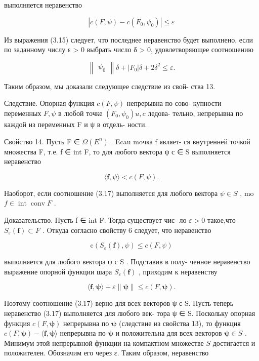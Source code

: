 \documentclass[8pt]{extarticle}
\begin{document}
выполняется неравенство

\[
\left| {c\left( {F,\psi }\right)  - c\left( {{F}_{0},{\psi }_{0}}\right) }\right|  \leq  \varepsilon
\]

Из выражения (3.15) следует, что последнее неравенство будет выполнено, если по заданному числу ε > 0 выбрать число δ > 0, удовлетворяющее соотношению

\[
\left\lVert \begin{array}{c} {\psi }_{0} \end{array} \right\rVert\delta  + \left| {F}_{0}\right| \delta  + 2{\delta }^{2} \leq  \varepsilon .
\]

Таким образом, мы доказали следующее следствие из свой- ства 13.

Следствие. Опорная функция \(c\left( {F,\psi }\right)\) непрерывна по сово- купности переменных \(F,\psi\) в любой точке \(\left( {{F}_{0},{\psi }_{0}}\right) u,c\) ледова- тельно, непрерывна по каждой из переменных F и ψ в отдель- ности.

Свойство 14. Пусть F ∈ \(\Omega \left( {E}^{n}\right)\) . Ecau moчка f являет- ся внутренней точкой множества F, т.е. f ∈ int F, то для любого вектора ψ с ∈ S выполняется неравенство

\[
\langle \mathbf{f},\psi \rangle  < c\left( {F,\psi }\right) . \tag{3.17}
\]

Наоборот, если соотношение (3.17) выполняется для любого вектора \(\psi  \in  S\) , mo \(f \in  \operatorname{int}\operatorname{conv}F\) .

Доказательство. Пусть f ∈ int F. Тогда существует чис- ло \(\varepsilon  > 0\) такое,что \({S}_{\varepsilon }\left( \mathbf{f}\right)  \subset  F\) . Oткуда согласно свойству 6 следует, что неравенство

\[
\mathrm{c}\left( {{S}_{\varepsilon }\left( \mathbf{f}\right) ,\psi }\right)  \leq  c\left( {F,\psi }\right)
\]

выполняется для любого вектора ψ с S . Подставив в полу- ченное неравенство выражение опорной функции шара \({S}_{\varepsilon }\left( \mathbf{f}\right)\) , приходим к неравенству

\[
\langle \mathbf{f},\mathbf{\psi }\rangle  + \varepsilon \parallel \mathbf{\psi }\parallel  \leq  c\left( {F,\mathbf{\psi }}\right) .
\]

Поэтому соотношение (3.17) верно для всех векторов ψ с S. Пусть теперь неравенство (3.17) выполняется для любого век- тора ψ ∈ S. Поскольку опорная функция \(c\left( {F,\mathbf{\psi }}\right)\) непрерывна по \(\mathbf{\psi }\) (следствие из свойства 13), то функция \(c\left( {F,\mathbf{\psi }}\right)  - \langle \mathbf{f},\mathbf{\psi }\rangle\) непрерывна по \(\mathbf{\psi }\) и положительна для всех векторов \(\mathbf{\psi } \in  S\) . Минимум этой непрерывной функции на компактном множестве \(S\) достигается и положителен. Обозначим его через ε. Таким образом, неравенство
\end{document}
